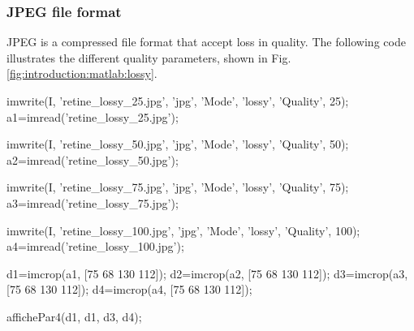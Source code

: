 \subsubsection{JPEG file format}

JPEG is a compressed file format that accept loss in quality. The following code illustrates the different quality parameters, shown in Fig.\ref{fig:introduction:matlab:lossy}.

\begin{matlab}
imwrite(I, 'retine_lossy_25.jpg', 'jpg', 'Mode', 'lossy', 'Quality', 25);
a1=imread('retine_lossy_25.jpg');

imwrite(I, 'retine_lossy_50.jpg', 'jpg', 'Mode', 'lossy', 'Quality', 50);
a2=imread('retine_lossy_50.jpg');

imwrite(I, 'retine_lossy_75.jpg', 'jpg', 'Mode', 'lossy', 'Quality', 75);
a3=imread('retine_lossy_75.jpg');

imwrite(I, 'retine_lossy_100.jpg', 'jpg', 'Mode', 'lossy', 'Quality', 100);
a4=imread('retine_lossy_100.jpg');

d1=imcrop(a1, [75 68 130 112]);
d2=imcrop(a2, [75 68 130 112]);
d3=imcrop(a3, [75 68 130 112]);
d4=imcrop(a4, [75 68 130 112]);

affichePar4(d1, d1, d3, d4);
\end{matlab}

